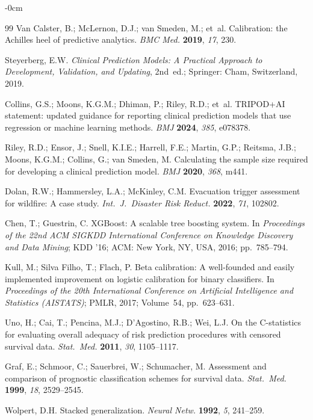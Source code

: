 \documentclass[fire,article,submit,pdftex]{../Definitions/mdpi}
\begin{document}
\begin{adjustwidth}{-\extralength}{0cm}
\begin{thebibliography}{99}
Van Calster, B.; McLernon, D.J.; van Smeden, M.; et~al.
Calibration: the Achilles heel of predictive analytics.
\textit{BMC Med.} \textbf{2019}, \textit{17}, 230.

Steyerberg, E.W.
\textit{Clinical Prediction Models: A Practical Approach to Development, Validation, and Updating}, 2nd~ed.;
Springer: Cham, Switzerland, 2019.

Collins, G.S.; Moons, K.G.M.; Dhiman, P.; Riley, R.D.; et~al.
TRIPOD+AI statement: updated guidance for reporting clinical prediction models that use regression or machine learning methods.
\textit{BMJ} \textbf{2024}, \textit{385}, e078378.

Riley, R.D.; Ensor, J.; Snell, K.I.E.; Harrell, F.E.; Martin, G.P.; Reitsma, J.B.; Moons, K.G.M.; Collins, G.; van Smeden, M.
Calculating the sample size required for developing a clinical prediction model.
\textit{BMJ} \textbf{2020}, \textit{368}, m441.

Dolan, R.W.; Hammersley, L.A.; McKinley, C.M.
Evacuation trigger assessment for wildfire: A case study.
\textit{Int.\ J.\ Disaster Risk Reduct.} \textbf{2022}, \textit{71}, 102802.

Chen, T.; Guestrin, C.
XGBoost: A scalable tree boosting system.
In \textit{Proceedings of the 22nd ACM SIGKDD International Conference on Knowledge Discovery and Data Mining};
KDD '16; ACM: New York, NY, USA, 2016; pp.~785--794.

Kull, M.; Silva Filho, T.; Flach, P.
Beta calibration: A well-founded and easily implemented improvement on logistic calibration for binary classifiers.
In \textit{Proceedings of the 20th International Conference on Artificial Intelligence and Statistics (AISTATS)};
PMLR, 2017; Volume~54, pp.~623--631.

Uno, H.; Cai, T.; Pencina, M.J.; D'Agostino, R.B.; Wei, L.J.
On the C-statistics for evaluating overall adequacy of risk prediction procedures with censored survival data.
\textit{Stat.\ Med.} \textbf{2011}, \textit{30}, 1105--1117.

Graf, E.; Schmoor, C.; Sauerbrei, W.; Schumacher, M.
Assessment and comparison of prognostic classification schemes for survival data.
\textit{Stat.\ Med.} \textbf{1999}, \textit{18}, 2529--2545.

Wolpert, D.H.
Stacked generalization.
\textit{Neural Netw.} \textbf{1992}, \textit{5}, 241--259.


\end{thebibliography}
\end{adjustwidth}
\end{document}
